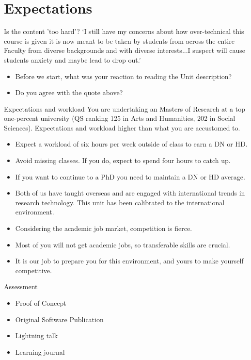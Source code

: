 \documentclass[aspectratio=169, 11pt]{beamer} %
\begin{document}
\section{Expectations}

\begin{frame}{Is the content 'too hard'?}
 `I still have my concerns about how over-technical this course is given it is now meant to be taken by students from across the entire Faculty from diverse backgrounds and with diverse interests...I suspect will cause students anxiety and maybe lead to drop out.'
    \begin{itemize}[label=\textbullet]
        \item Before we start, what was your reaction to reading the Unit description?
        \item Do you agree with the quote above?
    \end{itemize}
\end{frame}

\begin{frame}{Expectations and workload}
  You are undertaking an Masters of Research at a top one-percent university (QS ranking 125 in Arts and Humanities, 202 in Social Sciences). Expectations and workload higher than what you are accustomed to.
    \begin{itemize}[label=\textbullet]
        \item Expect a workload of six hours per week outside of class to earn a DN or HD.
        \item Avoid missing classes. If you do, expect to spend four hours to catch up.
        \item If you want to continue to a PhD you need to maintain a DN or HD average.
        \item Both of us have taught overseas and are engaged with international trends in research technology. This unit has been calibrated to the international environment.
        \item Considering the academic job market, competition is fierce.
        \item Most of you will not get academic jobs, so transferable skills are crucial.
        \item It is our job to prepare you for this environment, and yours to make yourself competitive.
    \end{itemize}
\end{frame}

\begin{frame}{Assessment}

\begin{itemize}[label=\textbullet]
    \item Proof of Concept
    \item Original Software Publication
    \item Lightning talk
    \item Learning journal
\end{itemize}

\end{frame}
\end{document}

